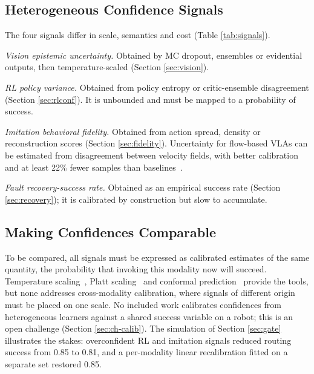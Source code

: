 \documentclass[journal]{IEEEtran}
\begin{document}
\subsection{Heterogeneous Confidence Signals}\label{sec:hetero}
The four signals differ in scale, semantics and cost (Table \ref{tab:signals}).

\textit{Vision epistemic uncertainty.} Obtained by MC dropout, ensembles or evidential outputs, then temperature-scaled (Section \ref{sec:vision}).

\textit{RL policy variance.} Obtained from policy entropy or critic-ensemble disagreement (Section \ref{sec:rlconf}). It is unbounded and must be mapped to a probability of success.

\textit{Imitation behavioral fidelity.} Obtained from action spread, density or reconstruction scores (Section \ref{sec:fidelity}). Uncertainty for flow-based VLAs can be estimated from disagreement between velocity fields, with better calibration and at least 22\% fewer samples than baselines~\cite{Romer2026a}.

\textit{Fault recovery-success rate.} Obtained as an empirical success rate (Section \ref{sec:recovery}); it is calibrated by construction but slow to accumulate.


\subsection{Making Confidences Comparable}\label{sec:comparable}
To be compared, all signals must be expressed as calibrated estimates of the same quantity, the probability that invoking this modality now will succeed. Temperature scaling~\cite{Guo2017}, Platt scaling~\cite{Zollo2025} and conformal prediction~\cite{Ren2023,Lindemann2023,Xu2025} provide the tools, but none addresses cross-modality calibration, where signals of different origin must be placed on one scale. No included work calibrates confidences from heterogeneous learners against a shared success variable on a robot; this is an open challenge (Section \ref{sec:ch-calib}). The simulation of Section \ref{sec:gate} illustrates the stakes: overconfident RL and imitation signals reduced routing success from 0.85 to 0.81, and a per-modality linear recalibration fitted on a separate set restored 0.85.
\end{document}
